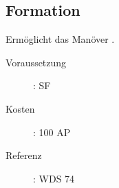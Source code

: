 \subsection{Formation}
\label{sf.formation}
Ermöglicht das Manöver .
\begin{description}
    \item[Voraussetzung]:
        SF 
    \item [Kosten]:
        100 AP
    \item [Referenz]:
        WDS 74
\end{description}
